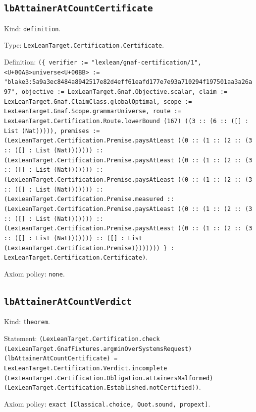 \documentclass[11pt]{article}
\begin{document}
\subsection*{\texttt{lbAttainerAtCountCertificate}}
\noindent Kind: \texttt{definition}.\par
\noindent Type: \texttt{LexLeanTarget.Certification.Certificate}.\par
\noindent Definition: \texttt{(\{ verifier := "lexlean/gnaf-certification/1", <U+00AB>universe<U+00BB> := "blake3:5a9a3ec8484a8942517e82d4eff61eafd177e7e93a710294f197501aa3a26a97", objective := LexLeanTarget.Gnaf.Objective.scalar, claim := LexLeanTarget.Gnaf.ClaimClass.globalOptimal, scope := LexLeanTarget.Gnaf.Scope.grammarUniverse, route := LexLeanTarget.Certification.Route.lowerBound (167) ((3 :: (6 :: ([] : List (Nat))))), premises := (LexLeanTarget.Certification.Premise.paysAtLeast ((0 :: (1 :: (2 :: (3 :: ([] : List (Nat))))))) :: (LexLeanTarget.Certification.Premise.paysAtLeast ((0 :: (1 :: (2 :: (3 :: ([] : List (Nat))))))) :: (LexLeanTarget.Certification.Premise.paysAtLeast ((0 :: (1 :: (2 :: (3 :: ([] : List (Nat))))))) :: (LexLeanTarget.Certification.Premise.measured :: (LexLeanTarget.Certification.Premise.paysAtLeast ((0 :: (1 :: (2 :: (3 :: ([] : List (Nat))))))) :: (LexLeanTarget.Certification.Premise.paysAtLeast ((0 :: (1 :: (2 :: (3 :: ([] : List (Nat))))))) :: ([] : List (LexLeanTarget.Certification.Premise)))))))) \} : LexLeanTarget.Certification.Certificate)}.\par
\noindent Axiom policy: \texttt{none}.\par
\subsection*{\texttt{lbAttainerAtCountVerdict}}
\noindent Kind: \texttt{theorem}.\par
\noindent Statement: \texttt{(LexLeanTarget.Certification.check (LexLeanTarget.GnafFixtures.argminOverSystemsRequest) (lbAttainerAtCountCertificate) = LexLeanTarget.Certification.Verdict.incomplete (LexLeanTarget.Certification.Obligation.attainersMalformed) (LexLeanTarget.Certification.Established.notCertified))}.\par
\noindent Axiom policy: \texttt{exact [Classical.choice, Quot.sound, propext]}.\par
\end{document}
